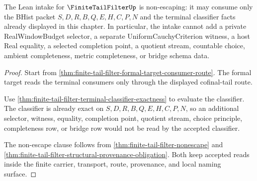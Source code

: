 \begin{theorem}
\label{thm:finite-tail-filter-lean-intake-nonescape}
The Lean intake for $\FiniteTailFilterUp$ is non-escaping: it may consume only the BHist packet $S,D,R,B,Q,E,H,C,P,N$ and the terminal classifier facts already displayed in this chapter. In particular, the intake cannot add a private RealWindowBudget selector, a separate UniformCauchyCriterion witness, a host Real equality, a selected completion point, a quotient stream, countable choice, ambient completeness, metric completeness, or bridge schema data.
\end{theorem}
\begin{proof}
Start from \autoref{thm:finite-tail-filter-formal-target-consumer-route}. The formal target reads the terminal consumers only through the displayed cofinal-tail route.

Use \autoref{thm:finite-tail-filter-terminal-classifier-exactness} to evaluate the classifier. The classifier is already exact on $S,D,R,B,Q,E,H,C,P,N$, so an additional selector, witness, equality, completion point, quotient stream, choice principle, completeness row, or bridge row would not be read by the accepted classifier.

The non-escape clause follows from \autoref{thm:finite-tail-filter-nonescape} and \autoref{thm:finite-tail-filter-structural-provenance-obligation}. Both keep accepted reads inside the finite carrier, transport, route, provenance, and local naming surface.
\end{proof}


